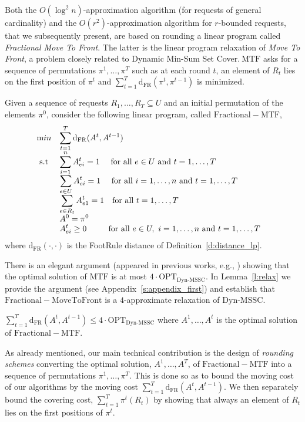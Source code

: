 \documentclass[a4paper,UKenglish,cleveref,autoref, thm-restate]{lipics-v2019}
\def\DSSC{\mathrm{Dyn}\text{-}\mathrm{MSSC}}
\def\dfr{\mathrm{d}_{\mathrm{FR}}}
\begin{document}
Both the $O(\log^2 n)$-approximation algorithm (for requests of general cardinality) and the $O(r^2 )$-approximation algorithm for $r$-bounded requests, that we subsequently present,
are based on rounding a linear program called \textit{Fractional Move To Front}. The latter is the linear program relaxation of \textit{Move To Front}, a problem closely related to Dynamic Min-Sum Set Cover.$~\mathrm{MTF}$ asks for a sequence of permutations $\pi^1,\ldots,\pi^T$ such as at each round $t$, an element of $R_t$ lies on the first position of $\pi^t$ and $\sum_{t=1}^T \mathrm{d}_{\mathrm{FR}}(\pi^t,\pi^{t-1})$ is minimized.

\begin{definition}\label{d:frac_MTF}
Given a sequence of requests $R_1,\ldots,R_T \subseteq U$ and an initial permutation of the elements $\pi^0$, consider the following linear program, called $\mathrm{Fractional- MTF}$,
\begin{equation*}
    \begin{array}{ll@{}ll}
        \text min & \displaystyle \sum_{t=1}^{T} \mathrm{d}_{\mathrm{FR}}(A^t,A^{t-1})&\\
        \text{ s.t } & \displaystyle \sum_{i=1}^{n} A_{ei}^t = 1 ~~~~\text{for all }e \in U\text{ and } t = 1,\ldots, T &&\\
        & \displaystyle \sum_{e \in U} A_{ei}^t = 1 ~~~~\text{for all }i = 1,\ldots,n\text{ and } t = 1,\ldots, T&\\
        & \displaystyle \sum_{e \in R_t} A_{e1}^t = 1 ~~~\text{for all } t = 1,\ldots, T&\\
        & \displaystyle A^0 = \pi^0 &&\\
        & \displaystyle A_{ei}^t \geq 0 ~~~~~~~~\text{for all } e \in U, ~i = 1,\ldots, n\text{ and } t = 1,\ldots, T&\\
    \end{array}
\end{equation*}
where $\mathrm{d}_{\mathrm{FR}}(\cdot,\cdot)$ is the FootRule distance of Definition~\ref{d:distance_lp}.
\end{definition}
\noindent  There is an elegant argument (appeared in previous works, e.g., \cite{FKKSV20})
showing that the optimal solution of $\mathrm{MTF}$ is at most $4 \cdot \mathrm{OPT}_{\DSSC}$. In Lemma~\ref{l:relax} we provide the argument
(see Appendix~\ref{s:appendix_first}) and establish that $\mathrm{Fractional- MoveToFront}$ is a $4$-approximate relaxation of $\DSSC$.
\begin{lemma}\label{l:relax}
$\sum_{t=1}^T \mathrm{d}_{\mathrm{FR}}(A^t,A^{t-1}) \leq 4 \cdot \mathrm{OPT}_{\DSSC}$
where $A^1,\ldots,A^t$ is the optimal solution of $\mathrm{Fractional- MTF}$.
\end{lemma}
As already mentioned, our main technical contribution is the design of \textit{rounding schemes} converting the optimal solution, $A^1,\ldots,A^T$, of $\mathrm{Fractional- MTF}$ into a sequence of permutations $\pi^1,\ldots,\pi^T$. This is done so as to bound the moving cost of our algorithms by the moving cost $\sum_{t=1}^T \dfr(A^t,A^{t-1})$. We then separately bound the covering cost, $\sum_{t=1}^T \pi^t(R_t)$ by showing that always an element of $R_t$ lies on the first positions of $\pi^t$.
\end{document}

